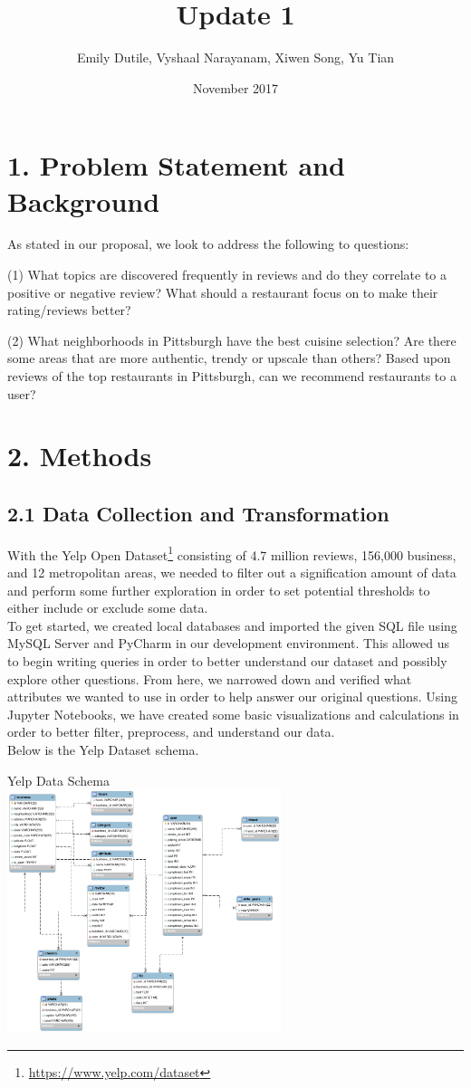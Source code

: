\documentclass{neu_handout}
\title{Update 1}
\author{Emily Dutile, Vyshaal Narayanam, Xiwen Song, Yu Tian}
\date{November 2017}
\begin{document}
\section*{1. Problem Statement and Background}
As stated in our proposal, we look to address the following to questions:

(1) What topics are discovered frequently in reviews and do they correlate to a positive or negative review? What should a restaurant focus on to make their rating/reviews better?

(2) What neighborhoods in Pittsburgh have the best cuisine selection? Are there some areas that are more authentic, trendy or upscale than others? Based upon reviews of the top restaurants in Pittsburgh, can we recommend restaurants to a user?

\section*{2. Methods}

\subsection*{2.1 Data Collection and Transformation}
With the Yelp Open Dataset\footnote{\url{https://www.yelp.com/dataset}} consisting of 4.7 million reviews, 156,000 business, and 12 metropolitan areas, we needed to filter out a signification amount of data and perform some further exploration in order to set potential thresholds to either include or exclude some data.\\
To get started, we created local databases and imported the given SQL file using MySQL Server and PyCharm in our development environment. This allowed us to begin writing queries in order to better understand our dataset and possibly explore other questions. From here, we narrowed down and verified what attributes we wanted to use in order to help answer our original questions.  Using Jupyter Notebooks, we have created some basic visualizations and calculations in order to better filter, preprocess, and understand our data.\\

Below is the Yelp Dataset schema.
\begin{center}
Yelp Data Schema\\
\includegraphics[width=80mm,scale=0.5]{schema}\\
\end{center}
\end{document}
